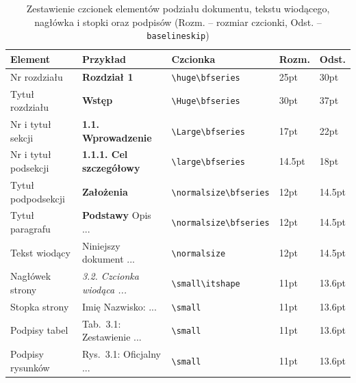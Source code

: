 \begin{table}[htb]
	\centering
	\caption{Zestawienie czcionek elementów podziału dokumentu, tekstu wiodącego, nagłówka i stopki oraz podpisów (Rozm. -- rozmiar czcionki, Odst. -- \texttt{baselineskip})}
	\label{tab:secfonts}\small
	\begin{tabularx}{\linewidth}{|ll@{\hskip 5pt}l@{\hskip 5pt}lX|} \hline
		Element              & Przykład                                   & Czcionka                    & Rozm.  & Odst.  \\ \hline\hline
		Nr rozdziału         & {\huge\bfseries Rozdział 1 }               & \verb?\huge\bfseries?       & 25pt   & 30pt   \\
		Tytuł rozdziału      & {\Huge\bfseries Wstęp }                    & \verb?\Huge\bfseries?       & 30pt   & 37pt   \\
		Nr i tytuł sekcji    & {\Large\bfseries 1.1. Wprowadzenie }       & \verb?\Large\bfseries?      & 17pt   & 22pt   \\
		Nr i tytuł podsekcji & {\large\bfseries 1.1.1. Cel szczegółowy }  & \verb?\large\bfseries?      & 14.5pt & 18pt   \\
		Tytuł podpodsekcji   & {\normalsize\bfseries Założenia }          & \verb?\normalsize\bfseries? & 12pt   & 14.5pt \\
		Tytuł paragrafu      & {\normalsize\bfseries  Podstawy } Opis ... & \verb?\normalsize\bfseries? & 12pt   & 14.5pt \\
		Tekst wiodący        & {\normalsize Niniejszy dokument ... }      & \verb?\normalsize?          & 12pt   & 14.5pt \\
		Nagłówek strony      & {\small\itshape 3.2. Czcionka wiodąca ...} & \verb?\small\itshape?       & 11pt   & 13.6pt \\
		Stopka strony        & {\small Imię Nazwisko: ...}                & \verb?\small?               & 11pt   & 13.6pt \\
		Podpisy tabel        & {\small Tab.~3.1: Zestawienie ...}         & \verb?\small?               & 11pt   & 13.6pt \\
		Podpisy rysunków     & {\small Rys.~3.1: Oficjalny ...}           & \verb?\small?               & 11pt   & 13.6pt \\\hline
	\end{tabularx}
\end{table}

